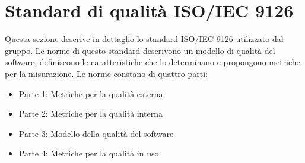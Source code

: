 \section{Standard di qualità ISO/IEC 9126}
Questa sezione descrive in dettaglio lo standard ISO/IEC 9126 utilizzato dal gruppo. Le norme di questo standard descrivono un modello di qualità del software, definiscono le caratteristiche che lo determinano e propongono metriche per la misurazione.
Le norme constano di quattro parti:
\begin{itemize}
\item Parte 1: Metriche per la qualità esterna
\item Parte 2: Metriche per la qualità interna
\item Parte 3: Modello della qualità del software
\item Parte 4: Metriche per la qualità in uso
\end{itemize}





